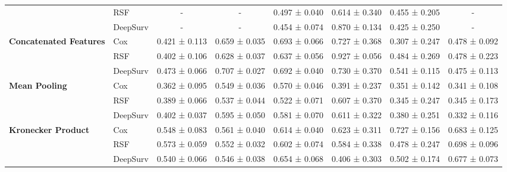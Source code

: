 \begin{sidewaystable}[htbp]
\begin{tabular}{@{}llcccccc@{}}
        & RSF & - & - & 0.497 ± 0.040 & 0.614 ± 0.340 & 0.455 ± 0.205 & - \\
        & DeepSurv & - & - & 0.454 ± 0.074 & 0.870 ± 0.134 & 0.425 ± 0.250 & - \\
        \midrule
        \multirow{3}{*}{\textbf{Concatenated Features}} & Cox & 0.421 ± 0.113 & 0.659 ± 0.035 & 0.693 ± 0.066 & 0.727 ± 0.368 & 0.307 ± 0.247 & 0.478 ± 0.092 \\
        & RSF & 0.402 ± 0.106 & 0.628 ± 0.037 & 0.637 ± 0.056 & 0.927 ± 0.056 & 0.484 ± 0.269 & 0.478 ± 0.223 \\
        & DeepSurv & 0.473 ± 0.066 & 0.707 ± 0.027 & 0.692 ± 0.040 & 0.730 ± 0.370 & 0.541 ± 0.115 & 0.475 ± 0.113 \\
        \midrule
        \multirow{3}{*}{\textbf{Mean Pooling}} & Cox & 0.362 ± 0.095 & 0.549 ± 0.036 & 0.570 ± 0.046 & 0.391 ± 0.237 & 0.351 ± 0.142 & 0.341 ± 0.108 \\
        & RSF & 0.389 ± 0.066 & 0.537 ± 0.044 & 0.522 ± 0.071 & 0.607 ± 0.370 & 0.345 ± 0.247 & 0.345 ± 0.173 \\
        & DeepSurv & 0.402 ± 0.037 & 0.595 ± 0.050 & 0.581 ± 0.070 & 0.611 ± 0.322 & 0.380 ± 0.251 & 0.332 ± 0.116 \\
        \midrule
        \multirow{3}{*}{\textbf{Kronecker Product}} & Cox & 0.548 ± 0.083 & 0.561 ± 0.040 & 0.614 ± 0.040 & 0.623 ± 0.311 & 0.727 ± 0.156 & 0.683 ± 0.125 \\
        & RSF & 0.573 ± 0.059 & 0.552 ± 0.032 & 0.602 ± 0.074 & 0.584 ± 0.338 & 0.478 ± 0.247 & 0.698 ± 0.096 \\
        & DeepSurv & 0.540 ± 0.066 & 0.546 ± 0.038 & 0.654 ± 0.068 & 0.406 ± 0.303 & 0.502 ± 0.174 & 0.677 ± 0.073 \\
        \bottomrule
    \end{tabular}
\end{sidewaystable}

